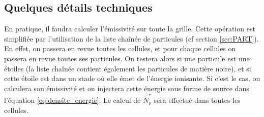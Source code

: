 

\subsection{Quelques détails techniques}

En pratique, il faudra calculer l'émissivité sur toute la grille.
Cette opération est simplifiée par l'utilisation de la liste chaînée de particules (cf section \ref{sec:PART}).
En effet, on passera en revue toutes les cellules, et pour chaque cellules on passera en revue toutes ses particules.
On testera alors si une particule est une étoiles (la liste chaînée contient également les particules de matière noire), et si cette étoile est dans un stade où elle émet de l'énergie ionisante.
Si c'est le cas, on calculera son émissivité et on injectera cette énergie sous forme de source dans l'équation \ref{eq:densite_energie}.
Le calcul de $\dot{N}_\nu^*$ sera effectué dans toutes les cellules.








%
